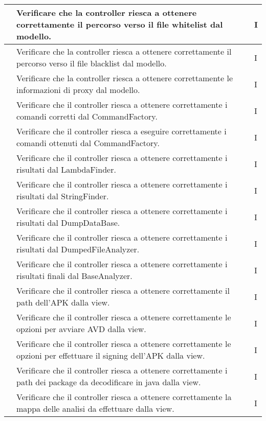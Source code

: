 \begin{center}
\begin{longtable}{ |C{3cm} | C{8.5cm}| C{1.5cm} |}
         &Verificare che la controller riesca a ottenere correttamente il percorso verso il file whitelist dal modello.& I \\\hline
         &Verificare che la controller riesca a ottenere correttamente il percorso verso il file blacklist dal modello.& I \\\hline
         &Verificare che la controller riesca a ottenere correttamente le informazioni di proxy dal modello.& I \\\hline
         &Verificare che il controller riesca a ottenere correttamente i comandi corretti dal CommandFactory.& I \\\hline
         &Verificare che il controller riesca a eseguire correttamente i comandi ottenuti dal CommandFactory.& I \\\hline
         &Verificare che il controller riesca a ottenere correttamente i risultati dal LambdaFinder.& I \\\hline
         &Verificare che il controller riesca a ottenere correttamente i risultati dal StringFinder.& I \\\hline
         &Verificare che il controller riesca a ottenere correttamente i risultati dal DumpDataBase.& I \\\hline
         &Verificare che il controller riesca a ottenere correttamente i risultati dal DumpedFileAnalyzer.& I \\\hline
         &Verificare che il controller riesca a ottenere correttamente i risultati finali dal BaseAnalyzer.& I \\\hline
         &Verificare che il controller riesca a ottenere correttamente il path dell'APK dalla view.& I \\\hline
         &Verificare che il controller riesca a ottenere correttamente le opzioni per avviare AVD dalla view.& I \\\hline
         &Verificare che il controller riesca a ottenere correttamente le opzioni per effettuare il signing dell'APK dalla view.& I \\\hline
         &Verificare che il controller riesca a ottenere correttamente i path dei package da decodificare in java dalla view.& I \\\hline
         &Verificare che il controller riesca a ottenere correttamente la mappa delle analisi da effettuare dalla view.& I \\\hline

\end{longtable}
\end{center}

